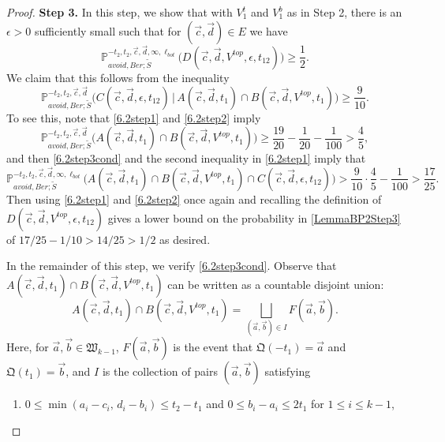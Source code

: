 \begin{proof}
	{\bf \raggedleft Step 3.} In this step, we show that with $V_1^t$ and $V_1^b$ as in Step 2, there is an $\epsilon > 0$ sufficiently small such that for $(\vec{c}, \vec{d}) \in E$ we have
	\begin{equation}\label{LemmaBP2Step3}
	\mathbb{P}^{-t_2,t_2,\vec{c},\vec{d},\infty,\ell_{bot}}_{avoid,Ber;\tilde S}\big(D(\vec{c},\vec{d},V^{top},\epsilon,t_{12}) \big) \geq \frac{1}{2}.
	\end{equation}
	We claim that this follows from the inequality
	\begin{equation}\label{6.2step3cond}
	\mathbb{P}^{-t_2,t_2,\vec{c},\vec{d}}_{avoid,Ber;\tilde S}\big(C(\vec{c},\vec{d},\epsilon,t_{12})\,|\,A(\vec{c},\vec{d},t_1) \cap B(\vec{c},\vec{d},V^{top},t_1)\big) \geq \frac{9}{10}.
	\end{equation}
	To see this, note that \eqref{6.2step1} and \eqref{6.2step2} imply
	\[
	\mathbb{P}^{-t_2,t_2,\vec{c},\vec{d}}_{avoid,Ber;\tilde S}\big(A(\vec{c},\vec{d},t_1) \cap B(\vec{c},\vec{d},V^{top},t_1)\big) \geq \frac{19}{20} - \frac{1}{20} - \frac{1}{100} > \frac{4}{5},
	\]
	and then \eqref{6.2step3cond} and the second inequality in \eqref{6.2step1} imply that
	\[
	\mathbb{P}^{-t_2,t_2,\vec{c},\vec{d},\infty,\ell_{bot}}_{avoid,Ber;\tilde S}\big(A(\vec{c},\vec{d},t_1) \cap B(\vec{c},\vec{d},V^{top},t_1) \cap C(\vec{c},\vec{d},\epsilon,t_{12})\big) > \frac{9}{10}\cdot\frac{4}{5} - \frac{1}{100} > \frac{17}{25}.
	\]
	Then using \eqref{6.2step1} and \eqref{6.2step2} once again and recalling the definition of $D(\vec{c},\vec{d},V^{top},\epsilon,t_{12}) $ gives a lower bound on the probability in \eqref{LemmaBP2Step3} of $17/25 - 1/10 > 14/25 > 1/2$ as desired. 
	
	In the remainder of this step, we verify \eqref{6.2step3cond}. Observe that $A(\vec{c},\vec{d},t_1) \cap B(\vec{c},\vec{d},V^{top},t_1)$ can be written as a countable disjoint union: 
	\begin{equation}\label{6.2step3disj}
	A(\vec{c},\vec{d},t_1) \cap B(\vec{c},\vec{d},V^{top},t_1) = \bigsqcup_{(\vec{a},\vec{b})\in I} F(\vec{a},\vec{b}).
	\end{equation}
	Here, for $\vec{a},\vec{b}\in\mathfrak{W}_{k-1}$, $F(\vec{a},\vec{b})$ is the event that $\mathfrak{Q}(-t_1) = \vec{a}$ and $\mathfrak{Q}(t_1) = \vec{b}$, and $I$ is the collection of pairs $(\vec{a},\vec{b})$ satisfying
	\begin{enumerate}[label = (\arabic*)]
		
		\item $ 0 \leq \min(a_i - c_i,\, d_i - b_i) \leq t_2 - t_1$ and $0\leq b_i-a_i \leq 2t_1$ for $1\leq i\leq k-1$,
		

\end{enumerate}
\end{proof}
